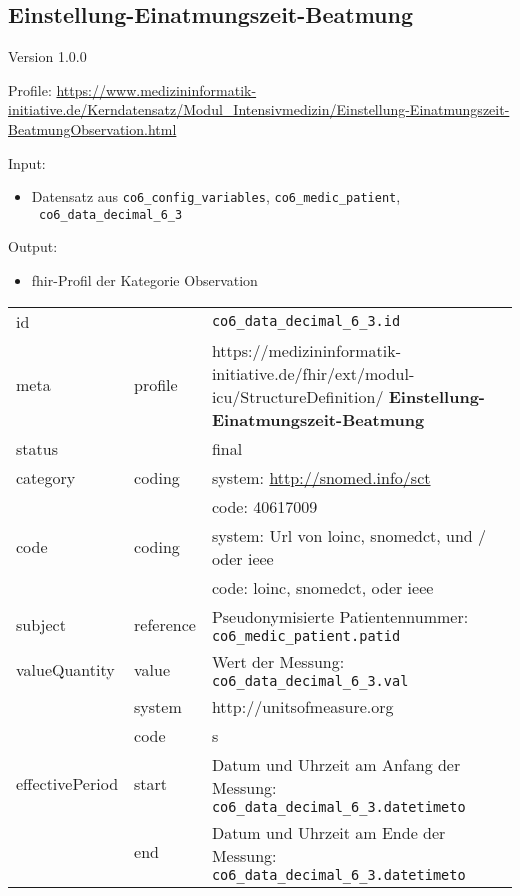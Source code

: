\subsection{Einstellung-Einatmungszeit-Beatmung} 
\noindent Version 1.0.0

\noindent Profile: \url{https://www.medizininformatik-initiative.de/Kerndatensatz/Modul_Intensivmedizin/Einstellung-Einatmungszeit-BeatmungObservation.html}

\noindent Input:
\begin{itemize}
	\item Datensatz aus \texttt{co6\_config\_variables}, \texttt{co6\_medic\_patient}, \\ \texttt{
co6\_data\_decimal\_6\_3}
\end{itemize}
Output:
\begin{itemize}
        \item \ac{fhir}-Profil der Kategorie \glqq Observation\grqq{}
\end{itemize}
\begin{longtable}{|l|l|p{7.5cm}|}
        \hline
        \rowcolor{lightgray} \multicolumn{3}{|l|}{Data Mapping (inhaltlich)} \\ \hline
        id &  & \texttt{co6\_data\_decimal\_6\_3.id} \\ \hline
	meta & profile & https://medizininformatik-initiative.de/fhir/ext/modul-icu/StructureDefinition/\textbf{
Einstellung-Einatmungszeit-Beatmung} \\ \hline 
	status &  & final  \\ \hline 
	category & coding & system: \url{http://snomed.info/sct} \\
\cline{3-3}
	& & code: 40617009\\ \hline
	code & coding & system: Url von \ac{loinc}, \ac{snomedct}, und / oder \ac{ieee} \\ 
	\cline{3-3} 
	 &  & code: \ac{loinc}, \ac{snomedct}, oder \ac{ieee} \\ \hline
	subject & reference & Pseudonymisierte Patientennummer: \texttt{co6\_medic\_patient.patid} \\ \hline
	valueQuantity & value & Wert der Messung: \texttt{
co6\_data\_decimal\_6\_3.val} \\
        \cline{2-3}
         & system & http://unitsofmeasure.org \\
         \cline{2-3}
         & code &
s
\\ \hline
    effectivePeriod & start & Datum und Uhrzeit am Anfang der Messung: \texttt{
co6\_data\_decimal\_6\_3.datetimeto} \\
    \cline{2-3}
     & end & Datum und Uhrzeit am Ende der Messung: \texttt{
co6\_data\_decimal\_6\_3.datetimeto} \\ \hline
\end{longtable}

